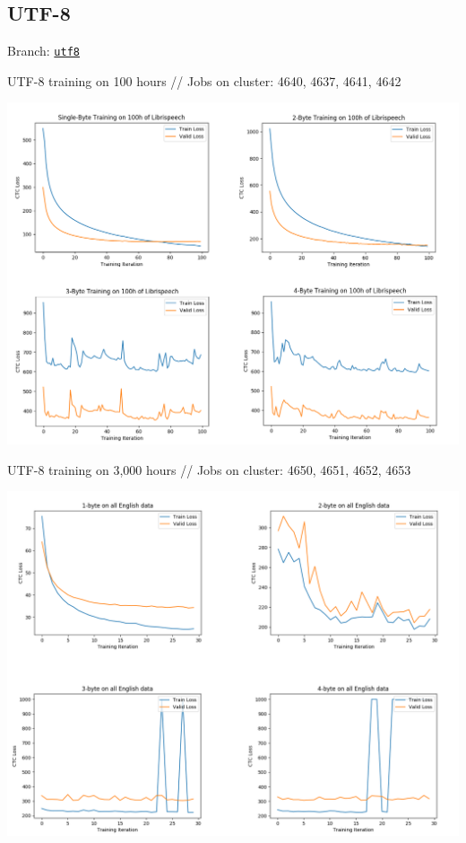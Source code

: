 \documentclass[12pt,a4paper]{article}
\begin{document}
\subsection*{UTF-8}

Branch: \href{https://github.com/mozilla/DeepSpeech/tree/utf8}{\texttt{utf8}}

UTF-8 training on 100 hours // Jobs on cluster: 4640, 4637, 4641, 4642

\begin{center}
\includegraphics[width=.85\textwidth,keepaspectratio]{figs/3.png}
\end{center}

UTF-8 training on 3,000 hours // Jobs on cluster: 4650, 4651, 4652, 4653

\begin{center}
\includegraphics[width=.85\textwidth,keepaspectratio]{figs/4.png}
\end{center}
\end{document}
